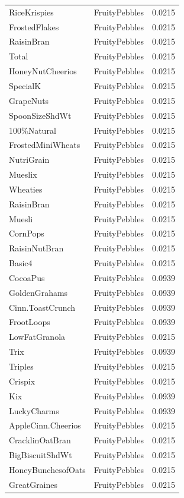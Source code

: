 \begin{table}[!htbp]
\begin{tabular}{lll}
RiceKrispies & FruityPebbles & 0.0215
\\
FrostedFlakes & FruityPebbles & 0.0215
\\
RaisinBran & FruityPebbles & 0.0215
\\
Total & FruityPebbles & 0.0215
\\
HoneyNutCheerios & FruityPebbles & 0.0215
\\
SpecialK & FruityPebbles & 0.0215
\\
GrapeNuts & FruityPebbles & 0.0215
\\
SpoonSizeShdWt & FruityPebbles & 0.0215
\\
100\%Natural & FruityPebbles & 0.0215
\\
FrostedMiniWheats & FruityPebbles & 0.0215
\\
NutriGrain & FruityPebbles & 0.0215
\\
Mueslix & FruityPebbles & 0.0215
\\
Wheaties & FruityPebbles & 0.0215
\\
RaisinBran & FruityPebbles & 0.0215
\\
Muesli & FruityPebbles & 0.0215
\\
CornPops & FruityPebbles & 0.0215
\\
RaisinNutBran & FruityPebbles & 0.0215
\\
Basic4 & FruityPebbles & 0.0215
\\
CocoaPus & FruityPebbles & 0.0939
\\
GoldenGrahams & FruityPebbles & 0.0939
\\
Cinn.ToastCrunch & FruityPebbles & 0.0939
\\
FrootLoops & FruityPebbles & 0.0939
\\
LowFatGranola & FruityPebbles & 0.0215
\\
Trix & FruityPebbles & 0.0939
\\
Triples & FruityPebbles & 0.0215
\\
Crispix & FruityPebbles & 0.0215
\\
Kix & FruityPebbles & 0.0939
\\
LuckyCharms & FruityPebbles & 0.0939
\\
AppleCinn.Cheerios & FruityPebbles & 0.0215
\\
CracklinOatBran & FruityPebbles & 0.0215
\\
BigBiscuitShdWt & FruityPebbles & 0.0215
\\
HoneyBunchesofOats & FruityPebbles & 0.0215
\\
GreatGraines & FruityPebbles & 0.0215
\\

\end{tabular}
\end{table}
